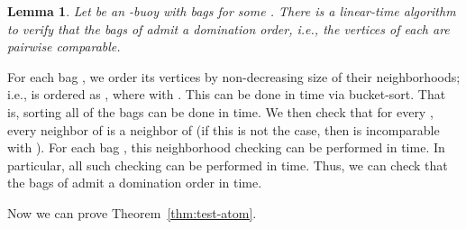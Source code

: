 \documentclass[11pt,a4paper]{article}
\newtheorem{lemma}[theorem]{Lemma}
\newenvironment{proof}{\noindent {\it Proof:~}}{\hfill \smallskip\par}
\begin{document}
\begin{lemma}\label{lem:find-buoy-domination}
Let  be an -buoy  with bags  for
some . There is a linear-time algorithm to verify that the
bags of  admit a domination order, i.e., the vertices of each
 are pairwise comparable.
\end{lemma}
\begin{proof}
For each bag , we order its vertices by non-decreasing size
of their neighborhoods; i.e.,  is ordered as , where  with . This can be
done in  time via bucket-sort.
That is, sorting all of the bags can be done in  time. We
then check that for every , every
neighbor of  is a neighbor of  (if this is not
the case, then  is incomparable with ). For each
bag , this neighborhood checking can be performed in
 time. In particular, all such
checking can be performed in  time. Thus, we can check that
the bags of  admit a domination order in  time.
\end{proof}

Now we can prove Theorem~\ref{thm:test-atom}.
\end{document}
